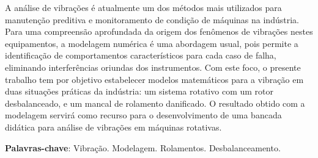 \imprimircapa
\imprimirfolhaderosto
\clearpage


%	

\begin{resumo}
	\SingleSpacing
	A análise de vibrações é atualmente um dos métodos mais utilizados para manutenção preditiva e monitoramento de condição de máquinas na indústria. 
	Para uma compreensão aprofundada da origem dos fenômenos de vibrações nestes equipamentos, a modelagem numérica é uma abordagem usual, pois permite a identificação de comportamentos característicos para cada caso de falha, eliminando interferências oriundas dos instrumentos.
	Com este foco, o presente trabalho tem por objetivo estabelecer modelos matemáticos para a vibração em duas situações práticas da indústria: um sistema rotativo com um rotor desbalanceado, e um mancal de rolamento danificado.
	O resultado obtido com a modelagem servirá como recurso para o desenvolvimento de uma bancada didática para análise de vibrações em máquinas rotativas.
	\vspace{\onelineskip}
	
	\noindent
	\textbf{Palavras-chave}: Vibração. Modelagem. Rolamentos. Desbalanceamento.
\end{resumo}

%		

\listoffigures*
\cleardoublepage

\listofquadros*
\cleardoublepage


\listofsiglas*
\cleardoublepage

\listofsimbolos*
\cleardoublepage

\tableofcontents*
\cleardoublepage
